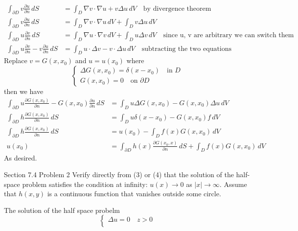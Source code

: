 \documentclass[answers,12pt,addpoints]{exam}
\begin{document}
\begin{questions}
\begin{solution}
\begin{align*}
            \int_{\partial D} v \frac{\partial u}{\partial n} \, dS &= \int_D \nabla v \cdot \nabla u + v \Delta u \, dV \quad \text{by divergence theorem}\\
            \int_{\partial D} v \frac{\partial u}{\partial n} \, dS &= \int_D \nabla v \cdot \nabla u \, dV + \int_D v \Delta u \, dV\\
            \int_{\partial D} u \frac{\partial v}{\partial n} \, dS &= \int_D \nabla u \cdot \nabla v \, dV + \int_D u \Delta v \, dV \quad \text{since u, v are arbitrary we can switch them}\\
            \int_{\partial D} u \frac{\partial v}{\partial n} - v \frac{\partial u}{\partial n} \, dS &= \int_D  u \cdot \Delta v -  v \cdot \Delta u \, dV \quad \text{subtracting the two equations}
        \end{align*}
        Replace $v = G(x, x_0)$ and $u = u(x_0)$ where 
        $$\begin{cases}
            \Delta G(x, x_0) = \delta(x - x_0) \quad \text{in } D\\
            G(x, x_0) = 0 \quad \text{on } \partial D
        \end{cases}$$
        then we have 
        \begin{align*}
            \int_{\partial D} u \frac{\partial G(x, x_0)}{\partial n} - G(x, x_0) \frac{\partial u}{\partial n} \, dS &= \int_D u \Delta G(x, x_0) - G(x, x_0) \Delta u \, dV\\
            \int_{\partial D} h \frac{\partial G(x, x_0)}{\partial n} \, dS &= \int_D u \delta(x - x_0) - G(x, x_0) f \, dV\\
            \int_{\partial D} h \frac{\partial G(x, x_0)}{\partial n} \, dS &= u(x_0) - \int_D f(x) G(x, x_0) \, dV\\
            u(x_0) &= \int_{\partial D} h(x) \frac{\partial G(x_0, x)}{\partial n} \, dS + \int_D f(x) G(x,x_0) \, dV
        \end{align*}
        As desired.
    \end{solution}
    \question Section 7.4 Problem 2
    Verify directly from (3) or (4) that the solution of the half-space problem satisfies the condition at infinity: \( u(x) \to 0 \) as \( |x| \to \infty \). Assume that \( h(x,y) \) is a continuous function that vanishes outside some circle.
    \begin{solution}
        The solution of the half space probelm 
        $$\begin{cases}
            \Delta u = 0 \quad z >0 \\

\end{cases}$$
\end{solution}
\end{questions}
\end{document}

